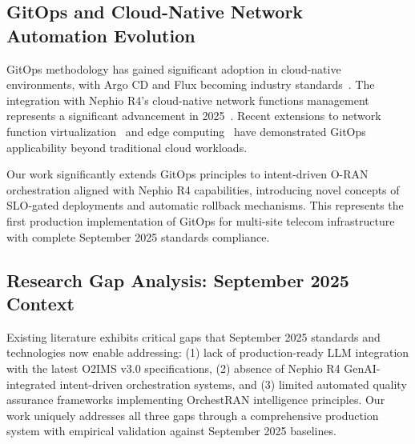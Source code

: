 \subsection{GitOps and Cloud-Native Network Automation Evolution}

GitOps methodology has gained significant adoption in cloud-native environments, with Argo CD and Flux becoming industry standards~\cite{cncf2025gitops}. The integration with Nephio R4's cloud-native network functions management represents a significant advancement in 2025~\cite{singh2025gitops}. Recent extensions to network function virtualization~\cite{kumar2025edge} and edge computing~\cite{thompson2025multisite} have demonstrated GitOps applicability beyond traditional cloud workloads.

Our work significantly extends GitOps principles to intent-driven O-RAN orchestration aligned with Nephio R4 capabilities, introducing novel concepts of SLO-gated deployments and automatic rollback mechanisms. This represents the first production implementation of GitOps for multi-site telecom infrastructure with complete September 2025 standards compliance.

\subsection{Research Gap Analysis: September 2025 Context}

Existing literature exhibits critical gaps that September 2025 standards and technologies now enable addressing: (1) lack of production-ready LLM integration with the latest O2IMS v3.0 specifications, (2) absence of Nephio R4 GenAI-integrated intent-driven orchestration systems, and (3) limited automated quality assurance frameworks implementing OrchestRAN intelligence principles. Our work uniquely addresses all three gaps through a comprehensive production system with empirical validation against September 2025 baselines.